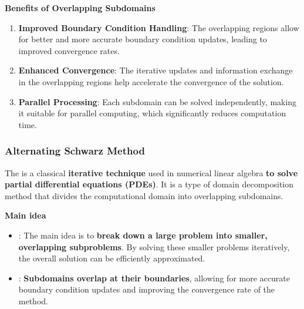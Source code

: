 \highspace
\begin{flushleft}
    \textcolor{Green3}{ \textbf{Benefits of Overlapping Subdomains}}
\end{flushleft}
\begin{enumerate}
    \item \textbf{Improved Boundary Condition Handling}: The overlapping regions allow for better and more accurate boundary condition updates, leading to improved convergence rates.
    \item \textbf{Enhanced Convergence}: The iterative updates and information exchange in the overlapping regions help accelerate the convergence of the solution.
    \item \textbf{Parallel Processing}: Each subdomain can be solved independently, making it suitable for parallel computing, which significantly reduces computation time.
\end{enumerate}

\newpage

\subsubsection{Alternating Schwarz Method}

The  is a classical \textbf{iterative technique} used in numerical linear algebra \textbf{to solve partial differential equations (PDEs)}. It is a type of domain decomposition method that divides the computational domain into overlapping subdomains.

\highspace
\begin{flushleft}
    \textcolor{Green3}{ \textbf{Main idea}}
\end{flushleft}
\begin{itemize}
    \item {}: The main idea is to \textbf{break down a large problem into smaller, overlapping subproblems}. By solving these smaller problems iteratively, the overall solution can be efficiently approximated.
    \item {}: \textbf{Subdomains overlap at their boundaries}, allowing for more accurate boundary condition updates and improving the convergence rate of the method.
\end{itemize}

